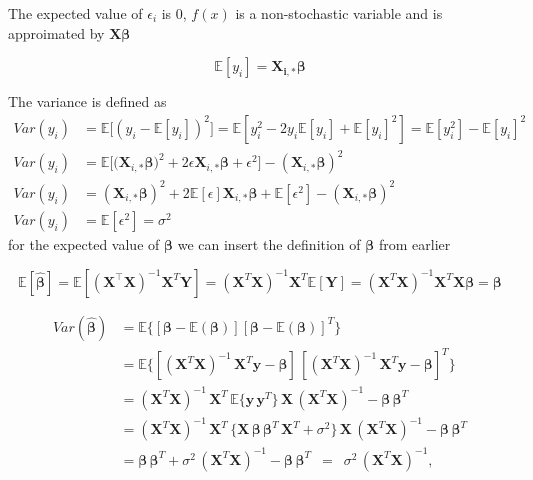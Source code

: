 \documentclass[twoside,11pt]{report}
\begin{document}
The expected value of $\epsilon_i$ is $0$, $f(x)$ is a non-stochastic variable and is approimated by $\mathbf{X}\mathbf{\beta}$

$$
\mathbb{E}[y_i] = \mathbf{X_{i,*}}\mathbf{\beta}
$$

The variance is defined as
\begin{align*}
Var(y_i) &= \mathbb{E}\big[(y_i - \mathbb{E}[y_i])^2\big] = \mathbb{E}\left[y_i^2 - 2y_i\mathbb{E}[y_i] + \mathbb{E}[y_i]^2\right] = \mathbb{E}[y_i^2] - \mathbb{E}[y_i]^2\\
Var(y_i) &= \mathbb{E}\big[\big(\mathbf{X}_{i,*}\mathbf{\beta}\big)^2 + 2\epsilon \mathbf{X}_{i,*}\mathbf{\beta} + \epsilon^2 \big] - (\mathbf{X}_{i,*}\mathbf{\beta})^2\\
Var(y_i) &= (\mathbf{X}_{i,*}\mathbf{\beta})^2 + 2\mathbb{E}[\epsilon]\mathbf{X}_{i,*}\mathbf{\beta} + \mathbb{E}[\epsilon^2] - (\mathbf{X}_{i,*}\mathbf{\beta})^2\\
Var(y_i) &= \mathbb{E}[\epsilon^2] = \sigma^2
\end{align*}
for the expected value of $\mathbf{\beta}$ we can insert the definition of $\mathbf{\beta}$ from earlier


$$
\mathbb{E}[\mathbf{\hat{\beta}}] = \mathbb{E}[ (\mathbf{X}^{\top} \mathbf{X})^{-1}\mathbf{X}^{T} \mathbf{Y}]=(\mathbf{X}^{T} \mathbf{X})^{-1}\mathbf{X}^{T} \mathbb{E}[ \mathbf{Y}]=(\mathbf{X}^{T} \mathbf{X})^{-1} \mathbf{X}^{T}\mathbf{X}\mathbf{\beta}=\mathbf{\beta}
$$


\begin{align*}
Var(\mathbf{\hat{\beta}}) & = \mathbb{E} \{ [\mathbf{\beta} - \mathbb{E}(\mathbf{\beta})] [\mathbf{\beta} - \mathbb{E}(\mathbf{\beta})]^{T} \}
\\
& = \mathbb{E} \{ [(\mathbf{X}^{T} \mathbf{X})^{-1} \, \mathbf{X}^{T} \mathbf{y} - \mathbf{\beta}] \, [(\mathbf{X}^{T} \mathbf{X})^{-1} \, \mathbf{X}^{T} \mathbf{y} - \mathbf{\beta}]^{T} \}
\\
& = (\mathbf{X}^{T} \mathbf{X})^{-1} \, \mathbf{X}^{T} \, \mathbb{E} \{ \mathbf{y} \, \mathbf{y}^{T} \} \, \mathbf{X} \, (\mathbf{X}^{T} \mathbf{X})^{-1} - \mathbf{\beta} \, \mathbf{\beta}^{T}
\\
& = (\mathbf{X}^{T} \mathbf{X})^{-1} \, \mathbf{X}^{T} \, \{ \mathbf{X} \, \mathbf{\beta} \, \mathbf{\beta}^{T} \,  \mathbf{X}^{T} + \sigma^2 \} \, \mathbf{X} \, (\mathbf{X}^{T} \mathbf{X})^{-1} - \mathbf{\beta} \, \mathbf{\beta}^{T}
\\
& = \mathbf{\beta} \, \mathbf{\beta}^{T}  + \sigma^2 \, (\mathbf{X}^{T} \mathbf{X})^{-1} - \mathbf{\beta} \, \mathbf{\beta}^{T}
\, \, \, = \, \, \, \sigma^2 \, (\mathbf{X}^{T} \mathbf{X})^{-1},
\end{align*}
\end{document}
